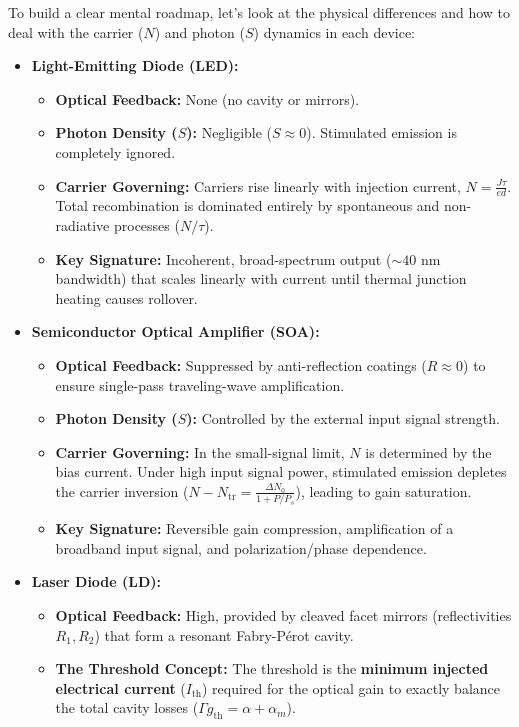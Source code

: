 To build a clear mental roadmap, let's look at the physical differences and how to deal with the carrier ($N$) and photon ($S$) dynamics in each device:
\begin{itemize}
    \item \textbf{Light-Emitting Diode (LED):} 
    \begin{itemize}
        \item \textbf{Optical Feedback:} None (no cavity or mirrors).
        \item \textbf{Photon Density ($S$):} Negligible ($S \approx 0$). Stimulated emission is completely ignored.
        \item \textbf{Carrier Governing:} Carriers rise linearly with injection current, $N = \frac{J\tau}{ed}$. Total recombination is dominated entirely by spontaneous and non-radiative processes ($N/\tau$).
        \item \textbf{Key Signature:} Incoherent, broad-spectrum output ($\sim 40\text{ nm}$ bandwidth) that scales linearly with current until thermal junction heating causes rollover.
    \end{itemize}
    \item \textbf{Semiconductor Optical Amplifier (SOA):}
    \begin{itemize}
        \item \textbf{Optical Feedback:} Suppressed by anti-reflection coatings ($R \approx 0$) to ensure single-pass traveling-wave amplification.
        \item \textbf{Photon Density ($S$):} Controlled by the external input signal strength.
        \item \textbf{Carrier Governing:} In the small-signal limit, $N$ is determined by the bias current. Under high input signal power, stimulated emission depletes the carrier inversion ($N - N_{\text{tr}} = \frac{\Delta N_0}{1 + P/P_s}$), leading to gain saturation.
        \item \textbf{Key Signature:} Reversible gain compression, amplification of a broadband input signal, and polarization/phase dependence.
    \end{itemize}
    \item \textbf{Laser Diode (LD):}
    \begin{itemize}
        \item \textbf{Optical Feedback:} High, provided by cleaved facet mirrors (reflectivities $R_1, R_2$) that form a resonant Fabry-Pérot cavity.
        \item \textbf{The Threshold Concept:} The threshold is the \textbf{minimum injected electrical current} ($I_{\text{th}}$) required for the optical gain to exactly balance the total cavity losses ($\Gamma g_{\text{th}} = \alpha + \alpha_m$).

\end{itemize}
\end{itemize}
